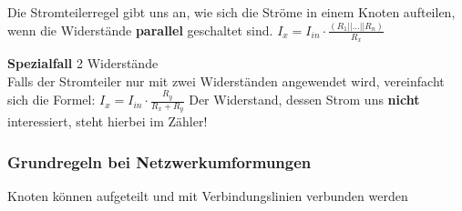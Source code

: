 					\fix
										\beginip
											Die Stromteilerregel gibt uns an, wie sich die Ströme in einem Knoten aufteilen, wenn die Widerstände \textbf{parallel} geschaltet sind.
											\fspace
											\formulaBegin
											$\displaystyle I_x = I_{in} \cdot \frac{(R_1 || ... || R_n)} {R_x} $
											\formulaEnd
					\fix
											\begin{center}
											\end{center}
											\fix
											\textbf{Spezialfall} 2 Widerstände \\
											Falls der Stromteiler nur mit zwei Widerständen angewendet wird, vereinfacht sich die Formel:
											\fspace
											\formulaBegin
											$\displaystyle I_x = I_{in} \cdot \frac{R_y}{R_x + R_y} $
											\formulaEnd
											Der Widerstand, dessen Strom uns \textbf{nicht} interessiert, steht hierbei im Zähler!
										\iend

										\subsubsection{Grundregeln bei Netzwerkumformungen}
					\fix \fix
										\beginip
										 	Knoten können aufgeteilt und mit Verbindungslinien verbunden werden\\
											\begin{center}
											\end{center}
										\iend

